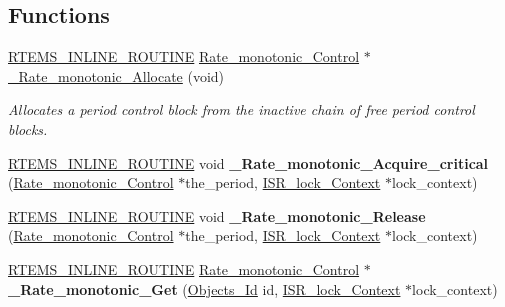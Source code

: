 \subsection*{Functions}
\begin{DoxyCompactItemize}
\item 
\mbox{\hyperlink{group__RTEMSScoreBaseDefs_gac216239df231d5dbd15e3520b0b9313f}{R\+T\+E\+M\+S\+\_\+\+I\+N\+L\+I\+N\+E\+\_\+\+R\+O\+U\+T\+I\+NE}} \mbox{\hyperlink{structRate__monotonic__Control}{Rate\+\_\+monotonic\+\_\+\+Control}} $\ast$ \mbox{\hyperlink{group__ClassicRateMonImpl_ga2a5ad9dc60929d941bd4d22c6ee69045}{\+\_\+\+Rate\+\_\+monotonic\+\_\+\+Allocate}} (void)
\begin{DoxyCompactList}\small\item\em Allocates a period control block from the inactive chain of free period control blocks. \end{DoxyCompactList}\item 
\mbox{\label{group__ClassicRateMonImpl_gae49c0e00563f58a849944135d5c316cd}} 
\mbox{\hyperlink{group__RTEMSScoreBaseDefs_gac216239df231d5dbd15e3520b0b9313f}{R\+T\+E\+M\+S\+\_\+\+I\+N\+L\+I\+N\+E\+\_\+\+R\+O\+U\+T\+I\+NE}} void {\bfseries \+\_\+\+Rate\+\_\+monotonic\+\_\+\+Acquire\+\_\+critical} (\mbox{\hyperlink{structRate__monotonic__Control}{Rate\+\_\+monotonic\+\_\+\+Control}} $\ast$the\+\_\+period, \mbox{\hyperlink{structISR__lock__Context}{I\+S\+R\+\_\+lock\+\_\+\+Context}} $\ast$lock\+\_\+context)
\item 
\mbox{\label{group__ClassicRateMonImpl_ga95cf6dc5dfb1e993a22066834528aaba}} 
\mbox{\hyperlink{group__RTEMSScoreBaseDefs_gac216239df231d5dbd15e3520b0b9313f}{R\+T\+E\+M\+S\+\_\+\+I\+N\+L\+I\+N\+E\+\_\+\+R\+O\+U\+T\+I\+NE}} void {\bfseries \+\_\+\+Rate\+\_\+monotonic\+\_\+\+Release} (\mbox{\hyperlink{structRate__monotonic__Control}{Rate\+\_\+monotonic\+\_\+\+Control}} $\ast$the\+\_\+period, \mbox{\hyperlink{structISR__lock__Context}{I\+S\+R\+\_\+lock\+\_\+\+Context}} $\ast$lock\+\_\+context)
\item 
\mbox{\label{group__ClassicRateMonImpl_gafca768d067ab935fdf8d53ebb425d72b}} 
\mbox{\hyperlink{group__RTEMSScoreBaseDefs_gac216239df231d5dbd15e3520b0b9313f}{R\+T\+E\+M\+S\+\_\+\+I\+N\+L\+I\+N\+E\+\_\+\+R\+O\+U\+T\+I\+NE}} \mbox{\hyperlink{structRate__monotonic__Control}{Rate\+\_\+monotonic\+\_\+\+Control}} $\ast$ {\bfseries \+\_\+\+Rate\+\_\+monotonic\+\_\+\+Get} (\mbox{\hyperlink{group__RTEMSScoreObject_ga5821f52a51072941bdd603e542d0863e}{Objects\+\_\+\+Id}} id, \mbox{\hyperlink{structISR__lock__Context}{I\+S\+R\+\_\+lock\+\_\+\+Context}} $\ast$lock\+\_\+context)

\end{DoxyCompactItemize}
